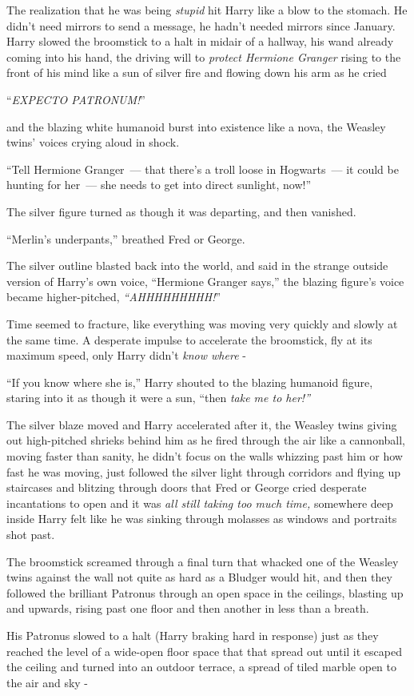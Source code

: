 The realization that he was being \emph{stupid} hit Harry like a blow to the stomach. He didn't need mirrors to send a message, he hadn't needed mirrors since January. Harry slowed the broomstick to a halt in midair of a hallway, his wand already coming into his hand, the driving will to \emph{protect Hermione Granger} rising to the front of his mind like a sun of silver fire and flowing down his arm as he cried

``\emph{EXPECTO PATRONUM!}''

and the blazing white humanoid burst into existence like a nova, the Weasley twins' voices crying aloud in shock.

``Tell Hermione Granger~--- that there's a troll loose in Hogwarts~--- it could be hunting for her~--- she needs to get into direct sunlight, now!''

The silver figure turned as though it was departing, and then vanished.

``Merlin's underpants,'' breathed Fred or George.

The silver outline blasted back into the world, and said in the strange outside version of Harry's own voice, ``Hermione Granger says,'' the blazing figure's voice became higher-pitched, \emph{``AHHHHHHHHH!}''

Time seemed to fracture, like everything was moving very quickly and slowly at the same time. A desperate impulse to accelerate the broomstick, fly at its maximum speed, only Harry didn't \emph{know where} -

``If you know where she is,'' Harry shouted to the blazing humanoid figure, staring into it as though it were a sun, ``then \emph{take me to her!''}

The silver blaze moved and Harry accelerated after it, the Weasley twins giving out high-pitched shrieks behind him as he fired through the air like a cannonball, moving faster than sanity, he didn't focus on the walls whizzing past him or how fast he was moving, just followed the silver light through corridors and flying up staircases and blitzing through doors that Fred or George cried desperate incantations to open and it was \emph{all still taking too much time,} somewhere deep inside Harry felt like he was sinking through molasses as windows and portraits shot past.

The broomstick screamed through a final turn that whacked one of the Weasley twins against the wall not quite as hard as a Bludger would hit, and then they followed the brilliant Patronus through an open space in the ceilings, blasting up and upwards, rising past one floor and then another in less than a breath.

His Patronus slowed to a halt (Harry braking hard in response) just as they reached the level of a wide-open floor space that that spread out until it escaped the ceiling and turned into an outdoor terrace, a spread of tiled marble open to the air and sky -
